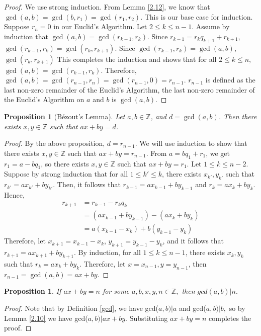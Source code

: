 \documentclass{article}
\newcommand{\Z}{\mathbb{Z}}
\newcommand{\st}{such that }
\newtheorem{prop}[thm]{Proposition}
\begin{document}
\begin{proof}
We use strong induction. From Lemma \ref{2.12}, we know that $\gcd(a,b)=\gcd(b,r_1)=\gcd(r_1,r_2)$. This is our base case for induction. Suppose $r_n = 0$ in our Euclid's Algorithm. Let $2 \leq k \leq n-1$. Assume by induction that $\gcd(a,b) = \gcd(r_{k-1}, r_k)$. Since $r_{k-1}=r_kq_{k+1} + r_{k+1}$, $\gcd(r_{k-1}, r_k) = \gcd(r_k, r_{k+1})$. Since $\gcd(r_{k-1}, r_k)=\gcd(a,b)$, $\gcd(r_k, r_{k+1})$ This completes the induction and shows that for all  $2 \leq k \leq n$, $\gcd(a,b) = \gcd(r_{k-1}, r_k)$. Therefore, $\gcd(a,b)=\gcd(r_{n-1},r_n)=\gcd(r_{n-1},0)=r_{n-1}$. $r_{n-1}$ is defined as the last non-zero remainder of the Euclid's Algorithm, the last non-zero remainder of the Euclid's Algorithm on $a$ and $b$ is $\gcd(a,b)$.
\end{proof}

\begin{prop}[Bézout's Lemma]
Let $a, b\in \Z$, and $d = \gcd(a,b)$. Then there exists $x, y \in \Z$ \st $ax+by=d$.
\end{prop}

\begin{proof}
\label{bezout}By the above proposition, $d=r_{n-1}$. We will use induction to show that there exists $x, y \in \Z$ \st $ax+by=r_{n-1}$. From $a = bq_1+r_1$, we get $r_1=a-bq_1$, so there exists $x,y \in \Z$ \st $ax+by=r_1$. Let $1 \leq k \leq n-2$. Suppose by strong induction that for all $1 \leq k' \leq k$, there exists $x_{k'}, y_{k'}$ \st $r_{k'} = ax_{k'}+by_{k'}$.  Then, it follows that $r_{k-1} = ax_{k-1} + by_{k-1}$ and $r_k=ax_k+by_k$. Hence, 
\begin{equation} 
\begin{split}
r_{k+1} & = r_{k-1}-r_kq_k \\
 & = (ax_{k-1} + by_{k-1})-(ax_k+by_k)\\
 & = a(x_{k-1}-x_k) + b(y_{k-1}-y_k)
\end{split}
\end{equation}
Therefore, let $x_{k+1}=x_{k-1}-x_k$, $y_{k+1}=y_{k-1}-y_k$, and it follows that $r_{k+1}=ax_{k+1}+by_{k+1}$. By induction, for all $1 \leq k \leq n-1$, there exists $x_k, y_k$ \st $r_k = ax_k+by_k$. Therefore, let $x=x_{n-1}, y=y_{n-1}$, then $r_{n-1}=\gcd(a,b)=ax+by$.
\end{proof}

\begin{prop}
\label{bezout reverse}If $ax+by=n$ for some $a,b,x,y,n\in \Z,$ then $gcd(a,b)|n.$ 
\end{prop}
\begin{proof}
Note that by Definition \ref{gcd}, we have gcd($a,b)|a$ and gcd($a,b)|b,$ so by Lemma \ref{2.10} we have gcd($a,b)|ax+by.$ Substituting $ax+by=n$ completes the proof.
\end{proof}
\end{document}
